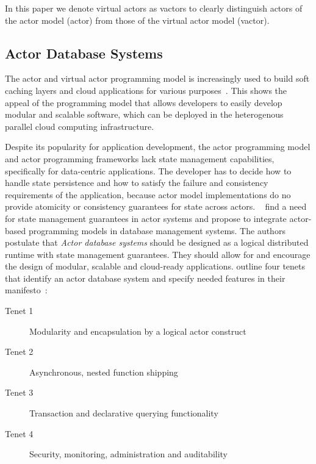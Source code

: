   In this paper we denote virtual actors as vactors to clearly distinguish actors of the actor model (actor) from those of the virtual actor model (vactor).



  \subsection{Actor Database Systems}
  The actor and virtual actor programming model is increasingly used to build soft caching layers and cloud applications for various purposes~\cite{erlang_uses,akka_uses,orleans_uses}.
  This shows the appeal of the programming model that allows developers to easily develop modular and scalable software, which can be deployed in the heterogenous parallel cloud computing infrastructure.
  
  Despite its popularity for application development, the actor programming model and actor programming frameworks lack state management capabilities, specifically for data-centric applications.
  The developer has to decide how to handle state persistence and how to satisfy the failure and consistency requirements of the application, because actor model implementations do no provide atomicity or consistency guarantees for state across actors.
  \citeauthor{manifesto}~\cite{manifesto} find a need for state management guarantees in actor systems and propose to integrate actor-based programming models in database management systems.
  The authors postulate that \textit{Actor database systems} should be designed as a logical distributed runtime with state management guarantees.
  They should allow for and encourage the design of modular, scalable and cloud-ready applications.
  \citeauthor{manifesto} outline four tenets that identify an actor database system and specify needed features in their manifesto~\cite{manifesto}:
  \begin{description}
    \item[Tenet 1] Modularity and encapsulation by a logical actor construct
    \item[Tenet 2] Asynchronous, nested function shipping
    \item[Tenet 3] Transaction and declarative querying functionality
    \item[Tenet 4] Security, monitoring, administration and auditability
  \end{description}

